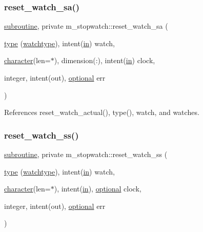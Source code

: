 \subsubsection{\texorpdfstring{reset\+\_\+watch\+\_\+sa()}{reset\_watch\_sa()}}
{\footnotesize\ttfamily \hyperlink{M__stopwatch_83_8txt_acfbcff50169d691ff02d4a123ed70482}{subroutine}, private m\+\_\+stopwatch\+::reset\+\_\+watch\+\_\+sa (\begin{DoxyParamCaption}\item[{\hyperlink{stop__watch_83_8txt_a70f0ead91c32e25323c03265aa302c1c}{type} (\hyperlink{structm__stopwatch_1_1watchtype}{watchtype}), intent(\hyperlink{M__journal_83_8txt_afce72651d1eed785a2132bee863b2f38}{in})}]{watch,  }\item[{\hyperlink{option__stopwatch_83_8txt_abd4b21fbbd175834027b5224bfe97e66}{character}(len=$\ast$), dimension(\+:), intent(\hyperlink{M__journal_83_8txt_afce72651d1eed785a2132bee863b2f38}{in})}]{clock,  }\item[{integer, intent(out), \hyperlink{option__stopwatch_83_8txt_aa4ece75e7acf58a4843f70fe18c3ade5}{optional}}]{err }\end{DoxyParamCaption})\hspace{0.3cm}{\ttfamily [private]}}



References reset\+\_\+watch\+\_\+actual(), type(), watch, and watches.

\mbox{\label{namespacem__stopwatch_a547e3482f3b6f3ff40e9d2f178f73095}} 
\subsubsection{\texorpdfstring{reset\+\_\+watch\+\_\+ss()}{reset\_watch\_ss()}}
{\footnotesize\ttfamily \hyperlink{M__stopwatch_83_8txt_acfbcff50169d691ff02d4a123ed70482}{subroutine}, private m\+\_\+stopwatch\+::reset\+\_\+watch\+\_\+ss (\begin{DoxyParamCaption}\item[{\hyperlink{stop__watch_83_8txt_a70f0ead91c32e25323c03265aa302c1c}{type} (\hyperlink{structm__stopwatch_1_1watchtype}{watchtype}), intent(\hyperlink{M__journal_83_8txt_afce72651d1eed785a2132bee863b2f38}{in})}]{watch,  }\item[{\hyperlink{option__stopwatch_83_8txt_abd4b21fbbd175834027b5224bfe97e66}{character}(len=$\ast$), intent(\hyperlink{M__journal_83_8txt_afce72651d1eed785a2132bee863b2f38}{in}), \hyperlink{option__stopwatch_83_8txt_aa4ece75e7acf58a4843f70fe18c3ade5}{optional}}]{clock,  }\item[{integer, intent(out), \hyperlink{option__stopwatch_83_8txt_aa4ece75e7acf58a4843f70fe18c3ade5}{optional}}]{err }\end{DoxyParamCaption})\hspace{0.3cm}{\ttfamily [private]}}



